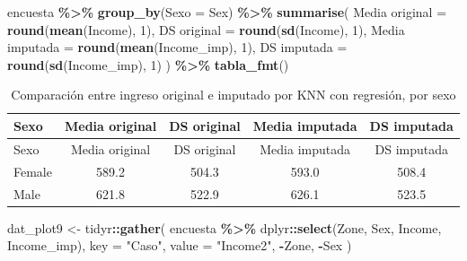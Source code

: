 \documentclass[
  spanish,
  12pt,
]{book}
\newenvironment{Shaded}{\begin{snugshade}}{\end{snugshade}}
\newcommand{\AttributeTok}[1]{\textcolor[rgb]{0.13,0.29,0.53}{#1}}
\newcommand{\DecValTok}[1]{\textcolor[rgb]{0.00,0.00,0.81}{#1}}
\newcommand{\FunctionTok}[1]{\textcolor[rgb]{0.13,0.29,0.53}{\textbf{#1}}}
\newcommand{\NormalTok}[1]{#1}
\newcommand{\OtherTok}[1]{\textcolor[rgb]{0.56,0.35,0.01}{#1}}
\newcommand{\SpecialCharTok}[1]{\textcolor[rgb]{0.81,0.36,0.00}{\textbf{#1}}}
\newcommand{\StringTok}[1]{\textcolor[rgb]{0.31,0.60,0.02}{#1}}
\begin{document}
\begin{Shaded}
\begin{Highlighting}[]
\NormalTok{encuesta }\SpecialCharTok{\%\textgreater{}\%}
  \FunctionTok{group\_by}\NormalTok{(}\AttributeTok{Sexo =}\NormalTok{ Sex) }\SpecialCharTok{\%\textgreater{}\%}
  \FunctionTok{summarise}\NormalTok{(}
    \StringTok{\textasciigrave{}}\AttributeTok{Media original}\StringTok{\textasciigrave{}}  \OtherTok{=} \FunctionTok{round}\NormalTok{(}\FunctionTok{mean}\NormalTok{(Income), }\DecValTok{1}\NormalTok{),}
    \StringTok{\textasciigrave{}}\AttributeTok{DS original}\StringTok{\textasciigrave{}}     \OtherTok{=} \FunctionTok{round}\NormalTok{(}\FunctionTok{sd}\NormalTok{(Income), }\DecValTok{1}\NormalTok{),}
    \StringTok{\textasciigrave{}}\AttributeTok{Media imputada}\StringTok{\textasciigrave{}}  \OtherTok{=} \FunctionTok{round}\NormalTok{(}\FunctionTok{mean}\NormalTok{(Income\_imp), }\DecValTok{1}\NormalTok{),}
    \StringTok{\textasciigrave{}}\AttributeTok{DS imputada}\StringTok{\textasciigrave{}}     \OtherTok{=} \FunctionTok{round}\NormalTok{(}\FunctionTok{sd}\NormalTok{(Income\_imp), }\DecValTok{1}\NormalTok{)}
\NormalTok{  ) }\SpecialCharTok{\%\textgreater{}\%} \FunctionTok{tabla\_fmt}\NormalTok{()}
\end{Highlighting}
\end{Shaded}

\begin{longtable}[]{@{}lcccc@{}}
\caption{\label{tab:tab-sesgo-knn-reg-sexo}Comparación entre ingreso original e imputado por KNN con regresión, por sexo}\tabularnewline
\toprule\noalign{}
Sexo & Media original & DS original & Media imputada & DS imputada \\
\midrule\noalign{}
\endfirsthead
\toprule\noalign{}
Sexo & Media original & DS original & Media imputada & DS imputada \\
\midrule\noalign{}
\endhead
\bottomrule\noalign{}
\endlastfoot
Female & 589.2 & 504.3 & 593.0 & 508.4 \\
Male & 621.8 & 522.9 & 626.1 & 523.5 \\
\end{longtable}

\begin{Shaded}
\begin{Highlighting}[]
\NormalTok{dat\_plot9 }\OtherTok{\textless{}{-}}\NormalTok{ tidyr}\SpecialCharTok{::}\FunctionTok{gather}\NormalTok{(}
\NormalTok{  encuesta }\SpecialCharTok{\%\textgreater{}\%}\NormalTok{ dplyr}\SpecialCharTok{::}\FunctionTok{select}\NormalTok{(Zone, Sex, Income, Income\_imp),}
  \AttributeTok{key =} \StringTok{"Caso"}\NormalTok{, }\AttributeTok{value =} \StringTok{"Income2"}\NormalTok{, }\SpecialCharTok{{-}}\NormalTok{Zone, }\SpecialCharTok{{-}}\NormalTok{Sex}
\NormalTok{)}
\end{Highlighting}
\end{Shaded}
\end{document}
